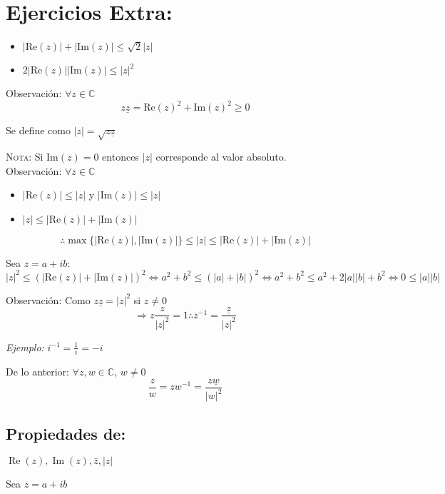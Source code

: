 \section{Ejercicios Extra:}
\begin{itemize}
  \item $|\text{Re}(z)|+|\text{Im}(z)|\leq \sqrt{2}|z|$
  \item $2|\text{Re}(z)||\text{Im}(z)|\leq |z|^2$
\end{itemize}

Observación: $\forall z \in \mathbb{C}$ 
\[
  z\underline{z}=\text{Re}(z)^2+\text{Im}(z)^2 \geq 0
\]
\begin{definition}[El módulo de $z$]
  Se define como $|z|=\sqrt{z\underline{z}}$
\end{definition}

\textsc{Nota: } Si $\text{Im}(z)=0$ entonces $|z|$ corresponde al valor absoluto.\\

Observación: $\forall z \in \mathbb{C}$
\begin{itemize}
  \item $|\text{Re}(z)|\leq |z|$ y $|\text{Im}(z)|\leq |z|$
  \item $|z|\leq |\text{Re}(z)|+|\text{Im}(z)|$
\end{itemize}

\[
  \therefore \max \{ |\text{Re}(z)|, |\text{Im}(z)| \}\leq |z| \leq |\text{Re}(z)|+|\text{Im}(z)|
\]

Sea $z=a+ib$:\\
$|z|^2\leq (|\text{Re}(z)|+|\text{Im}(z)|)^2 \Leftrightarrow a^2+b^2 \leq (|a|+|b|)^2 \Leftrightarrow a^2+b^2 \leq a^2+ 2|a||b|+b^2 \Leftrightarrow 0\leq |a||b|$

Observación: Como $z\underline{z} = |z|^2$ si $z\neq 0$
\[
  \Rightarrow z\displaystyle\frac{z}{ |z|^2 }=1 \therefore z^{-1}=\displaystyle\frac{\underline{z}}{|z|^2}
\]

\textit{Ejemplo:} $i^{-1}=\frac{1}{i}=-i$

De lo anterior: $\forall z,w \in \mathbb{C}$, $w \neq 0$\\
\[
  \displaystyle\frac{z}{w}=zw^{-1}=\displaystyle\frac{z\underline{w}}{|w|^2}
\]

\subsection{Propiedades de:}
$\operatorname{Re}(z), \operatorname{Im}(z), \bar{z},|z|$

Sea $z=a+i b$

